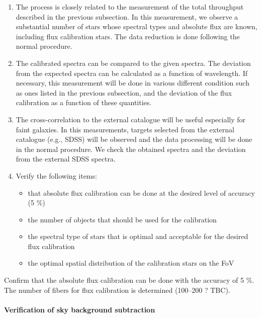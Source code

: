 \begin{enumerate}
\item{The process is closely related to the measurement of the total throughput described in the previous subsection. In this measurement, we observe a substantial number of stars whose spectral types and absolute flux are known, including flux calibration stars. The data reduction is done following the normal procedure.}

\item{The calibrated spectra can be compared to the given spectra. The deviation from the expected spectra can be calculated as a function of wavelength. If necessary, this measurement will be done in various different condition such as ones listed in the previous subsection, and the deviation of the flux calibration as a function of these quantities.}

\item{The cross-correlation to the external catalogue will be useful especially for faint galaxies. In this measurements, targets selected from the external catalogue (e.g., SDSS) will be observed and the data processing will be done in the normal procedure. We check the obtained spectra and the deviation from the external SDSS spectra.}

\item{Verify the following items:}
\begin{itemize}
\item{that absolute flux calibration can be done at the desired level of accuracy (5 \%)}
\item{the number of objects that should be used for the calibration}
\item{the spectral type of stars that is optimal and acceptable for the desired flux calibration}
\item{the optimal spatial distribution of the calibration stars on the FoV}
\end{itemize}
\end{enumerate}

\begin{itembox}[l]{}
Confirm that the absolute flux calibration can be done with the accuracy of 5 \%. \\
The number of fibers for flux calibration is determined (100--200 ? TBC).
\end{itembox}

\paragraph{Verification of sky background subtraction}

